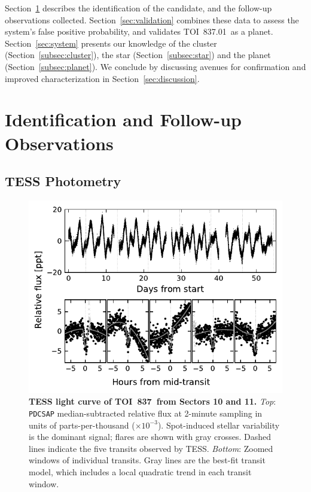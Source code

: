 \documentclass[12pt,twocolumn,tighten]{aastex63}
\newcommand{\tn}{TOI~837} %
\newcommand{\pn}{TOI~837.01} %
\begin{document}
Section~\ref{sec:observations} describes the identification of the
candidate, and the follow-up observations collected.
Section~\ref{sec:validation} combines these data to assess the
system's false positive probability, and validates \pn\ as a planet.
Section~\ref{sec:system} presents our knowledge of the cluster
(Section~\ref{subsec:cluster}), the star (Section~\ref{subsec:star})
and the planet (Section~\ref{subsec:planet}).  We conclude by
discussing avenues for confirmation and improved characterization in
Section~\ref{sec:discussion}.



\section{Identification and Follow-up Observations}
\label{sec:observations}


\subsection{TESS Photometry}
\label{subsec:tess}

\begin{figure}[!t]
	\begin{center}
		\leavevmode
		\includegraphics[width=1\textwidth]{f1.pdf}
	\end{center}
	\vspace{-0.7cm}
	\caption{
    {\bf TESS light curve of \tn\ from Sectors 10 and 11.} {\it Top}:
    \texttt{PDCSAP} median-subtracted relative flux at 2-minute
    sampling in units of parts-per-thousand ($\times 10^{-3}$).
    Spot-induced stellar variability is the dominant signal; flares are
    shown with gray crosses.  Dashed
    lines indicate the five transits observed by TESS.  {\it Bottom}:
    Zoomed windows of individual transits.
    Gray lines are the best-fit transit model, which includes a local
    quadratic trend in each transit window.
		\label{fig:rawzoom}
	}
\end{figure}
\end{document}
